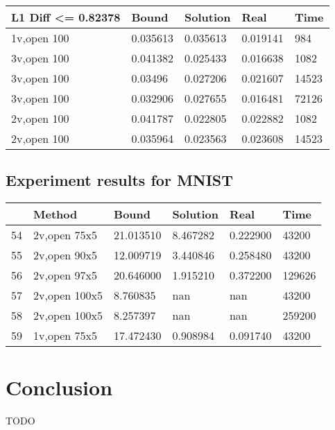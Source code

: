 \documentclass{llncs}
\begin{document}
	\begin{tabular}{|l|l|l|l|l|}\hline
	 L1 Diff <= 0.82378 &        Bound &  Solution &                          Real &  Time \\\hline
		1v,open 100 &     0.035613 &  0.035613 &                      0.019141 &   984 \\\hline
		3v,open 100 &     0.041382 &  0.025433 &                      0.016638 &  1082 \\\hline
		3v,open 100 &      0.03496 &  0.027206 &                      0.021607 & 14523 \\\hline
		3v,open 100 &     0.032906 &  0.027655 &                      0.016481 & 72126 \\\hline
		2v,open 100 &     0.041787 &  0.022805 &                      0.022882 &  1082 \\\hline
		2v,open 100 &     0.035964 &  0.023563 &                      0.023608 & 14523 \\\hline
	\end{tabular}
	
	
	\subsection{Experiment results for MNIST}
	
	
	\begin{tabular}{|l|l|l|l|l|l|}\hline
		& Method & Bound & Solution & Real & Time \\\hline
		54 & 2v,open 75x5 & 21.013510 & 8.467282 & 0.222900 & 43200 \\\hline
		55 & 2v,open 90x5 & 12.009719 & 3.440846 & 0.258480 & 43200 \\\hline
		56 & 2v,open 97x5 & 20.646000 & 1.915210 & 0.372200 & 129626 \\\hline
		57 & 2v,open 100x5 & 8.760835 & nan & nan & 43200 \\\hline
		58 & 2v,open 100x5 & 8.257397 & nan & nan & 259200 \\\hline
		59 & 1v,open 75x5 & 17.472430 & 0.908984 & 0.091740 & 43200 \\\hline
	\end{tabular}
	
	
	\section{Conclusion}
	
	TODO
	
	
	
	
	
	
	\bigskip
	
	\appendix
	
	
	
\end{document}
